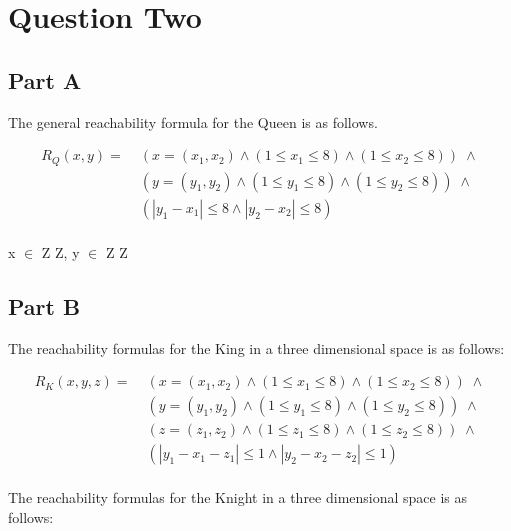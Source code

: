 \documentclass[a4paper]{article}
\begin{document}
\section*{Question Two}
\label{sec-2}
\subsection*{Part A}
\label{sec-2-1}
The general reachability formula for the Queen is as follows.

\begin{equation}
\begin{split}
R_Q(x, y) = \; &(x = (x_1, x_2) \wedge (1 \leq x_1 \leq 8) 
\wedge (1 \leq x_2 \leq 8)) \;\wedge \\
&(y = (y_1, y_2) \wedge (1 \leq y_1 \leq 8) 
\wedge (1 \leq y_2 \leq 8)) \;\wedge \\
&(|y_1 - x_1| \leq 8 \wedge |y_2 - x_2| \leq 8) \\
\end{split}
\end{equation}

x $\in$ Z \texttimes{} Z, y $\in$ Z \texttimes{} Z

\subsection*{Part B}
\label{sec-2-2}
The reachability formulas for the King in a three dimensional space is as
follows:

\begin{equation}
\begin{split}
R_K(x, y, z) = \; &(x = (x_1, x_2) \wedge (1 \leq x_1 \leq 8) 
                                   \wedge (1 \leq x_2 \leq 8)) \;\wedge \\
                  &(y = (y_1, y_2) \wedge (1 \leq y_1 \leq 8) 
                                   \wedge (1 \leq y_2 \leq 8)) \;\wedge \\
                  &(z = (z_1, z_2) \wedge (1 \leq z_1 \leq 8) 
                                   \wedge (1 \leq z_2 \leq 8)) \;\wedge \\
               &(|y_1 - x_1 - z_1| \leq 1 \wedge |y_2 - x_2 - z_2| \leq 1)\\
\end{split}
\end{equation}

The reachability formulas for the Knight in a three dimensional space is as
follows:
\end{document}
